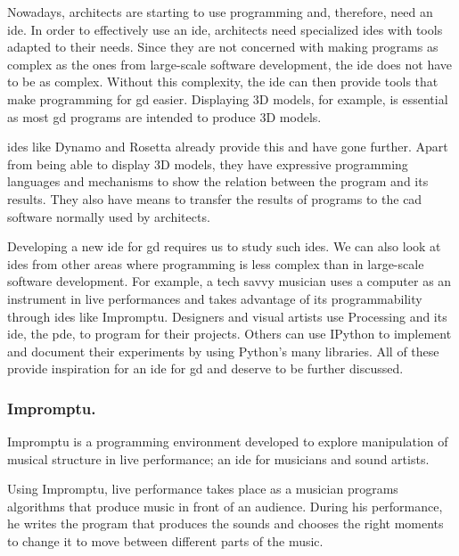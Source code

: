\documentclass{./llncs2e/llncs}
\begin{document}
	Nowadays, architects are starting to use programming and, therefore, need an \ac{ide}. 
	In order to effectively use an \ac{ide}, architects need specialized \acp{ide} with tools adapted to their needs.
	Since they are not concerned with making programs as complex as the ones from large-scale software development, the \ac{ide} does not have to be as complex.
	Without this complexity, the \ac{ide} can then provide tools that make programming for \ac{gd} easier.
	Displaying 3D models, for example, is essential as most \ac{gd} programs are intended to produce 3D models.
	
	\ac{ide}s like Dynamo\cite{dynamo2015site} and Rosetta\cite{de2012modern} already provide this and have gone further.
	Apart from being able to display 3D models, they have expressive programming languages and mechanisms to show the relation between the program and its results.
	They also have means to transfer the results of programs to the \ac{cad} software normally used by architects.
	
	Developing a new \ac{ide} for \ac{gd} requires us to study such \ac{ide}s.
	We can also look at \acp{ide} from other areas where programming is less complex than in large-scale software development.
	For example, a tech savvy musician uses a computer as an instrument in live performances and takes advantage of its programmability through \ac{ide}s like Impromptu.
	Designers and visual artists use Processing and its \ac{ide}, the \ac{pde}, to program for their projects.
	Others can use IPython to implement and document their experiments by using Python's many libraries.
	All of these provide inspiration for an \ac{ide} for \ac{gd} and deserve to be further discussed.
	
\subsubsection{Impromptu.}
	Impromptu\cite{sorensen2005impromptu,sorensen2010programming} is a programming environment developed to explore manipulation of musical structure in live performance; an \ac{ide} for musicians and sound artists.
	
	Using Impromptu, live performance takes place as a musician programs algorithms that produce music in front of an audience.
	During his performance, he writes the program that produces the sounds and chooses the right moments to change it to move between different parts of the music.
	
\end{document}
